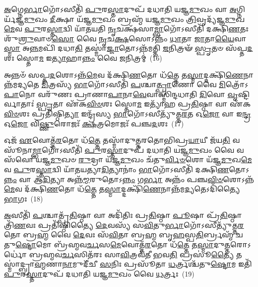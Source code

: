 \-\ul{𑌅}\-𑌗𑍍𑌨𑍇\-\ul{𑌰𑍍𑌭𑌾}\-𑌗𑍋᳴\-𑌽𑌸𑍀𑌤𑌿᳴ \ul{𑌪𑍁}\-𑌰\-\ul{𑌸𑍍𑌤𑌾}\-𑌦𑍁𑌪᳴ 𑌦𑌧𑌾𑌤𑌿 𑌯𑌜𑍍𑌞\-\ul{𑌮𑍁}\-𑌖𑌂 𑌵𑌾 \ul{𑌅}\-𑌗𑍍𑌨𑌿𑌰𑍍𑌯᳴𑌜𑍍𑌞\-\ul{𑌮𑍁}\-𑌖𑌂 \ul{𑌦𑍀}\-𑌕𑍍𑌷𑌾 𑌯᳴𑌜𑍍𑌞\-\ul{𑌮𑍁}\-𑌖𑌂 𑌬𑍍𑌰𑌹𑍍𑌮᳴ 𑌯𑌜𑍍𑌞\-\ul{𑌮𑍁}\-𑌖𑌂 \ul{𑌤𑍍𑌰𑌿}\-𑌵𑍃𑌦𑍍𑌯᳴𑌜𑍍𑌞\-\ul{𑌮𑍁}\-𑌖\-\ul{𑌮𑍇}\-𑌵 \ul{𑌪𑍁}\-𑌰\-\ul{𑌸𑍍𑌤𑌾}\-𑌦𑍍𑌵𑌿 𑌯𑌾᳴𑌤𑌯𑌤𑌿 \ul{𑌨𑍃}\-𑌚𑌕𑍍𑌷᳴𑌸𑌾\-\ul{𑌮𑍍𑌭𑌾}\-𑌗𑍋᳴\-𑌽𑌸𑍀𑌤𑌿᳴ 𑌦𑌕𑍍𑌷𑌿\-\ul{𑌣}\-𑌤𑌃 𑌶𑍁᳴\-\ul{𑌶𑍍𑌰𑍁}\-𑌵𑌾𑍞\-\ul{𑌸𑍋} 𑌵𑍈 \ul{𑌨𑍃}\-𑌚\-\ul{𑌕𑍍𑌷}\-𑌸𑍋\-𑌽𑌨𑍍𑌨𑌂᳴ \ul{𑌧𑌾}\-𑌤𑌾 \ul{𑌜𑌾}\-𑌤𑌾\-\ul{𑌯𑍈}\-𑌵𑌾\-\ul{𑌸𑍍𑌮𑌾} 𑌅\-\ul{𑌨𑍍𑌨}\-𑌮𑌪𑌿᳴ 𑌦𑌧𑌾\-\ul{𑌤𑌿} 𑌤𑌸𑍍𑌮𑌾॑\-\ul{𑌜𑍍𑌜𑌾}\-𑌤𑍋\-𑌽𑌨𑍍𑌨᳴𑌮𑌤𑍍𑌤𑌿 \ul{𑌜}\-𑌨𑌿𑌤𑍍𑌰𑍟᳴ \ul{𑌸𑍍𑌪𑍃}\-𑌤𑍞 𑌸᳴𑌪𑍍𑌤\-\ul{𑌦}\-𑌶𑌃 𑌸𑍍𑌤𑍋\-\ul{𑌮} 𑌇\-\ul{𑌤𑍍𑌯𑌾}\-𑌹𑌾\-\ul{𑌨𑍍𑌨𑌂} 𑌵𑍈 \ul{𑌜}\-𑌨𑌿𑌤𑍍𑌰𑌮𑍍॑~(16)

𑌅𑌨𑍍𑌨𑍞᳴ 𑌸𑌪𑍍𑌤\-\ul{𑌦}\-𑌶𑍋\-𑌽𑌨𑍍𑌨᳴\-\ul{𑌮𑍇}\-𑌵 𑌦᳴𑌕𑍍𑌷𑌿\-\ul{𑌣}\-𑌤𑍋 𑌧᳴\-\ul{𑌤𑍍𑌤𑍇} 𑌤\-\ul{𑌸𑍍𑌮𑌾}\-𑌦𑍍𑌦𑌕𑍍𑌷𑌿᳴\-\ul{𑌣𑍇}\-𑌨𑌾𑌨𑍍𑌨᳴𑌮𑌦𑍍𑌯𑌤𑍇 \ul{𑌮𑌿}\-𑌤𑍍𑌰𑌸𑍍𑌯᳴ \ul{𑌭𑌾}\-𑌗𑍋᳴\-𑌽𑌸𑍀𑌤𑌿᳴ \ul{𑌪}\-𑌶𑍍𑌚𑌾\-\ul{𑌤𑍍𑌪𑍍𑌰𑌾}\-𑌣𑍋 𑌵𑍈 \ul{𑌮𑌿}\-𑌤𑍍𑌰𑍋᳴\-𑌽\-\ul{𑌪𑌾}\-𑌨𑍋 𑌵𑌰𑍁᳴𑌣𑌃 𑌪𑍍𑌰𑌾𑌣𑌾\-\ul{𑌪𑌾}\-𑌨𑌾\-\ul{𑌵𑍇}\-𑌵𑌾𑌸𑍍𑌮𑌿᳴𑌨𑍍𑌦𑌧𑌾𑌤𑌿 \ul{𑌦𑌿}\-𑌵𑍋 \ul{𑌵𑍃}\-𑌷𑍍𑌟𑌿𑌰𑍍𑌵𑌾𑌤𑌾𑌃॑ \ul{𑌸𑍍𑌪𑍃}\-𑌤𑌾 𑌏᳴𑌕\-\ul{𑌵𑌿}\-\-\ul{𑍞}\-𑌶𑌃 𑌸𑍍𑌤𑍋\-\ul{𑌮} 𑌇𑌤𑍍𑌯𑌾᳴𑌹 𑌪𑍍𑌰\-\ul{𑌤𑌿}\-𑌷𑍍𑌠𑌾 𑌵𑌾 𑌏᳴𑌕\-\ul{𑌵𑌿}\-\-\ul{𑍞}\-𑌶𑌃 𑌪𑍍𑌰𑌤𑌿᳴𑌷𑍍𑌠𑌿\-\ul{𑌤𑍍𑌯𑌾} 𑌇𑌨𑍍𑌦𑍍𑌰᳴𑌸𑍍𑌯 \ul{𑌭𑌾}\-𑌗𑍋᳴\-𑌽𑌸𑍀𑌤𑍍𑌯𑍁᳴𑌤𑍍𑌤\-\ul{𑌰}\-𑌤 𑌓\-\ul{𑌜𑍋} 𑌵𑌾 𑌇\-\ul{𑌨𑍍𑌦𑍍𑌰} 𑌓\-\ul{𑌜𑍋} 𑌵𑌿\-\ul{𑌷𑍍𑌣𑍁}\-𑌰𑍋𑌜𑌃᳴ \ul{𑌕𑍍𑌷}\-𑌤𑍍𑌰𑌮𑍋𑌜𑌃᳴ 𑌪𑌞𑍍𑌚\-\ul{𑌦}\-𑌶𑌃~(17)

𑌓𑌜᳴ \ul{𑌏}\-𑌵𑍋𑌤𑍍𑌤᳴\-\ul{𑌰}\-𑌤𑍋 𑌧᳴\-\ul{𑌤𑍍𑌤𑍇} 𑌤𑌸𑍍𑌮𑌾᳴𑌦𑍁𑌤𑍍𑌤𑌰𑌤𑍋𑌭𑌿𑌪𑍍𑌰\-\ul{𑌯𑌾}\-𑌯𑍀 𑌜᳴𑌯\-\ul{𑌤𑌿} 𑌵𑌸𑍂᳴𑌨𑌾\-\ul{𑌮𑍍𑌭𑌾}\-𑌗𑍋᳴\-𑌽𑌸𑍀𑌤𑌿᳴ \ul{𑌪𑍁}\-𑌰\-\ul{𑌸𑍍𑌤𑌾}\-𑌦𑍁𑌪᳴ 𑌦𑌧𑌾𑌤𑌿 𑌯𑌜𑍍𑌞\-\ul{𑌮𑍁}\-𑌖𑌂 𑌵𑍈 𑌵𑌸᳴𑌵𑍋 ᳴𑌯𑌜𑍍𑌞\-\ul{𑌮𑍁}\-𑌖𑍞 \ul{𑌰𑍁}\-𑌦𑍍𑌰𑌾 𑌯᳴𑌜𑍍𑌞\-\ul{𑌮𑍁}\-𑌖𑌂 𑌚᳴𑌤𑍁\-\ul{𑌰𑍍𑌵𑌿}\-\-\ul{𑍞}\-𑌶𑍋 𑌯᳴𑌜𑍍𑌞\-\ul{𑌮𑍁}\-𑌖\-\ul{𑌮𑍇}\-𑌵 \ul{𑌪𑍁}\-𑌰\-\ul{𑌸𑍍𑌤𑌾}\-𑌦𑍍𑌵𑌿 𑌯𑌾᳴𑌤𑌯𑌤𑍍𑌯𑌾\-\ul{𑌦𑌿}\-𑌤𑍍𑌯𑌾𑌨𑌾𑌂॑ \ul{𑌭𑌾}\-𑌗𑍋᳴\-𑌽𑌸𑍀𑌤𑌿᳴ 𑌦𑌕𑍍𑌷𑌿\-\ul{𑌣}\-𑌤𑍋\-𑌽\-\ul{𑌨𑍍𑌨𑌂} 𑌵𑌾 𑌆᳴\-\ul{𑌦𑌿}\-𑌤𑍍𑌯𑌾 𑌅𑌨𑍍𑌨᳴\-\ul{𑌮𑍍𑌮}\-𑌰𑍁𑌤𑍋\-𑌽\-\ul{𑌨𑍍𑌨𑌂} 𑌗\-\ul{𑌰𑍍𑌭𑌾} 𑌅𑌨𑍍𑌨𑌂᳴ 𑌪𑌞𑍍𑌚\-\ul{𑌵𑌿}\-\-\ul{𑍞}\-𑌶𑍋\-𑌽𑌨𑍍𑌨᳴\-\ul{𑌮𑍇}\-𑌵 𑌦᳴𑌕𑍍𑌷𑌿\-\ul{𑌣}\-𑌤𑍋 𑌧᳴\-\ul{𑌤𑍍𑌤𑍇} 𑌤\-\ul{𑌸𑍍𑌮𑌾}\-𑌦𑍍𑌦𑌕𑍍𑌷𑌿᳴\-\ul{𑌣𑍇}\-𑌨𑌾𑌨𑍍𑌨᳴𑌮\-\ul{𑌦𑍍𑌯}\-𑌤𑍇\-𑌽𑌦𑌿᳴𑌤𑍍𑌯𑍈 \ul{𑌭𑌾}\-𑌗𑌃~(18)

\-\ul{𑌅}\-𑌸𑍀𑌤𑌿᳴ \ul{𑌪}\-𑌶𑍍𑌚𑌾𑌤𑍍𑌪𑍍𑌰᳴\-\ul{𑌤𑌿}\-𑌷𑍍𑌠𑌾 𑌵𑌾 𑌅𑌦𑌿᳴𑌤𑌿𑌃 𑌪𑍍𑌰\-\ul{𑌤𑌿}\-𑌷𑍍𑌠𑌾 \ul{𑌪𑍂}\-𑌷𑌾 𑌪𑍍𑌰᳴\-\ul{𑌤𑌿}\-𑌷𑍍𑌠𑌾 𑌤𑍍𑌰𑌿᳴\-\ul{𑌣}\-𑌵𑌃 𑌪𑍍𑌰𑌤𑌿᳴𑌷𑍍𑌠𑌿𑌤𑍍𑌯𑍈 \ul{𑌦𑍇}\-𑌵𑌸𑍍𑌯᳴ 𑌸\-\ul{𑌵𑌿}\-𑌤𑍁\-\ul{𑌰𑍍𑌭𑌾}\-𑌗𑍋᳴\-𑌽𑌸𑍀𑌤𑍍𑌯𑍁᳴𑌤𑍍𑌤\-\ul{𑌰}\-𑌤𑍋 𑌬𑍍𑌰\-\ul{𑌹𑍍𑌮} 𑌵𑍈 \ul{𑌦𑍇}\-𑌵𑌃 𑌸᳴\-\ul{𑌵𑌿}\-𑌤𑌾 𑌬𑍍𑌰\-\ul{𑌹𑍍𑌮} 𑌬𑍃\-\ul{𑌹}\-𑌸𑍍𑌪\-\ul{𑌤𑌿}\-𑌰𑍍𑌬𑍍𑌰𑌹𑍍𑌮᳴ 𑌚𑌤𑍁\-\ul{𑌷𑍍𑌟𑍋}\-𑌮𑍋 𑌬𑍍𑌰᳴𑌹𑍍𑌮𑌵\-\ul{𑌰𑍍𑌚}\-𑌸\-\ul{𑌮𑍇}\-𑌵𑍋𑌤𑍍𑌤᳴\-\ul{𑌰}\-𑌤𑍋 𑌧᳴\-\ul{𑌤𑍍𑌤𑍇} 𑌤\-\ul{𑌸𑍍𑌮𑌾}\-𑌦𑍁\-\ul{𑌤𑍍𑌤}\-𑌰𑍋\-𑌽𑌰𑍍𑌧𑍋॑ 𑌬𑍍𑌰𑌹𑍍𑌮𑌵\-\ul{𑌰𑍍𑌚}\-𑌸𑌿𑌤᳴𑌰𑌃 𑌸𑌾\-\ul{𑌵𑌿}\-𑌤𑍍𑌰𑌵᳴𑌤𑍀 𑌭𑌵\-\ul{𑌤𑌿} 𑌪𑍍𑌰𑌸𑍂॑\-\ul{𑌤𑍍𑌯𑍈} 𑌤𑌸𑍍𑌮𑌾॑𑌦𑍍𑌬𑍍𑌰𑌾\-\ul{𑌹𑍍𑌮}\-𑌣𑌾\-\ul{𑌨𑌾}\-𑌮𑍁𑌦𑍀᳴𑌚𑍀 \ul{𑌸}\-𑌨𑌿𑌃 𑌪𑍍𑌰𑌸𑍂᳴𑌤𑌾 \ul{𑌧}\-𑌰𑍍𑌤𑍍𑌰𑌶𑍍𑌚᳴𑌤𑍁\-\ul{𑌷𑍍𑌟𑍋}\-𑌮 𑌇𑌤𑌿᳴ \ul{𑌪𑍁}\-𑌰\-\ul{𑌸𑍍𑌤𑌾}\-𑌦𑍁𑌪᳴ 𑌦𑌧𑌾𑌤𑌿 𑌯𑌜𑍍𑌞\-\ul{𑌮𑍁}\-𑌖𑌂 𑌵𑍈 \ul{𑌧}\-𑌰𑍍𑌤𑍍𑌰𑌃~(19)

